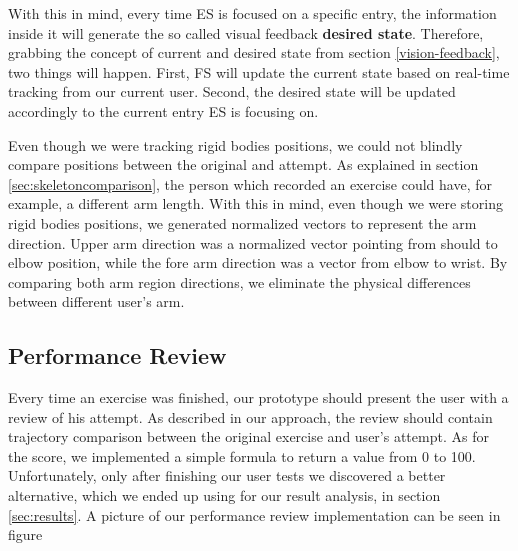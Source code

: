 With this in mind, every time \ac{ES} is focused on a specific entry, the information inside it will generate the so called visual feedback \textbf{desired state}. 
Therefore, grabbing the concept of current and desired state from section \ref{vision-feedback}, two things will happen. 
First, \ac{FS} will update the current state based on real-time tracking from our current user. 
Second, the desired state will be updated accordingly to the current entry \ac{ES} is focusing on.

Even though we were tracking rigid bodies positions, we could not blindly compare positions between the original and attempt.
As explained in section \ref{sec:skeletoncomparison}, the person which recorded an exercise could have, for example, a different arm length.
With this in mind, even though we were storing rigid bodies positions, we generated normalized vectors to represent the arm direction. 
Upper arm direction was a normalized vector pointing from should to elbow position, while the fore arm direction was a vector from elbow to wrist.
By comparing both arm region directions, we eliminate the physical differences between different user's arm.


\subsection{Performance Review}


Every time an exercise was finished, our prototype should present the user with a review of his attempt. 
As described in our approach, the review should contain trajectory comparison between the original exercise and user's attempt.
As for the score, we implemented a simple formula to return a value from 0 to 100. 
Unfortunately, only after finishing our user tests we discovered a better alternative, which we ended up using for our result analysis, in section \ref{sec:results}.
A picture of our performance review implementation can be seen in figure 
